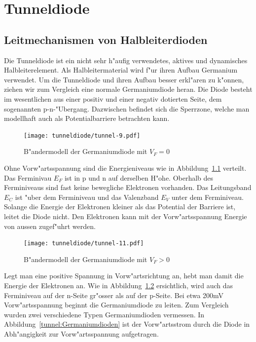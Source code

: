 
\chapter{Tunneldiode\label{chapter:tunneldiode}}
\begin{refsection}

\section{Leitmechanismen von Halbleiterdioden}

Die Tunneldiode ist ein nicht sehr h"aufig verwendetes, aktives und dynamisches Halbleiterelement.
Als Halbleitermaterial wird f"ur ihren  Aufbau Germanium verwendet. 
Um die Tunneldiode und ihren Aufbau besser erkl"aren zu k"onnen, ziehen wir zum Vergleich eine normale Germaniumdiode heran. 
Die Diode besteht im wesentlichen aus einer positiv und einer negativ dotierten Seite, dem sogenannten p-n-"Ubergang. 
Dazwischen befindet sich die Sperrzone, welche man modellhaft auch als Potentialbarriere betrachten kann.

\begin{figure}	%
\centering
\texttt{[image: tunneldiode/tunnel-9.pdf]}
\caption{B"andermodell der Germaniumdiode mit $V_F = 0$
\label{tunnel:BaendermodellG0}}
\end{figure}

Ohne Vorw"artsspannung sind die Energieniveaus wie in Abbildung~\ref{tunnel:BaendermodellG0} verteilt. 
Das Ferminivau $E_F$ ist in p und n auf derselben H"ohe.
Oberhalb des Ferminiveaus sind fast keine bewegliche Elektronen vorhanden.
Das Leitungsband $E_C$ ist "uber dem Ferminiveau  und das Valenzband $E_V$ unter dem Ferminiveau. 
Solange die Energie der Elektronen kleiner als das Potential der Barriere ist, leitet die Diode nicht.
Den Elektronen kann mit der Vorw"artsspannung Energie von aussen zugef"uhrt werden.

\begin{figure}	%
\centering
\texttt{[image: tunneldiode/tunnel-11.pdf]}
\caption{B"andermodell der Germaniumdiode mit $V_F > 0$
\label{tunnel:BaendermodellG}}
\end{figure}

Legt man eine positive Spannung in Vorw"artsrichtung an, hebt man damit die Energie der Elektronen an. 
Wie in Abbildung~\ref{tunnel:BaendermodellG} ersichtlich, wird auch das Ferminiveau auf der n-Seite gr"osser als auf der p-Seite. 
Bei etwa 200mV Vorw"artsspannung beginnt die Germaniumdiode zu leiten. 
Zum Vergleich wurden zwei verschiedene Typen Germaniumdioden vermessen. 
In Abbildung~\ref{tunnel:Germaniumdioden} ist der Vorw"artsstrom durch die Diode in Abh"angigkeit zur Vorw"artsspannung aufgetragen.


\end{refsection}
